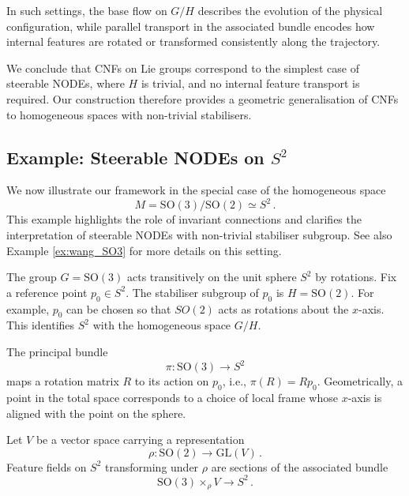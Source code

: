 \documentclass[12pt,a4paper]{article}
\numberwithin{equation}{section}
\theoremstyle{plain}
\theoremstyle{definition}
\theoremstyle{remark}
\begin{document}
In such settings, the base flow on $G/H$ describes the evolution of the physical configuration, while parallel transport in the associated bundle encodes how internal features are rotated or transformed consistently along the trajectory.

We conclude that CNFs on Lie groups correspond to the simplest case of steerable NODEs, where $H$ is trivial, and no internal feature transport is required. Our construction therefore provides a geometric generalisation of CNFs to homogeneous spaces with non-trivial stabilisers.

\subsection{Example: Steerable NODEs on $S^2$}
We now illustrate our framework in the special case of the homogeneous space
\begin{equation}
    M = \mathrm{SO}(3)/\mathrm{SO}(2) \simeq S^2 \,.
\end{equation}
This example highlights the role of invariant connections and clarifies the interpretation of steerable NODEs with non-trivial stabiliser subgroup. See also Example \ref{ex:wang_SO3} for more details on this setting. 

The group $G = \mathrm{SO}(3)$ acts transitively on the unit sphere $S^2$ by rotations. Fix a reference point $p_0 \in S^2$. The stabiliser subgroup of $p_0$ is $H = \mathrm{SO}(2)$. For example, $p_0$ can be chosen so that $SO(2)$ acts as rotations about the $x$-axis. This identifies $S^2$ with the homogeneous space $G/H$.

The principal bundle
\begin{equation}
    \pi : \mathrm{SO}(3) \to S^2
\end{equation}
maps a rotation matrix $R$ to its action on $p_0$, i.e., $\pi(R) = R p_0$. Geometrically, a point in the total space corresponds to a choice of local frame whose $x$-axis is aligned with the point on the sphere.

Let $V$ be a vector space carrying a representation
\begin{equation}
    \rho : \mathrm{SO}(2) \to \mathrm{GL}(V)\,.
\end{equation}
Feature fields on $S^2$ transforming under $\rho$ are sections of the associated bundle
\begin{equation}
    \mathrm{SO}(3) \times_\rho V \to S^2\,.
\end{equation}
\end{document}
